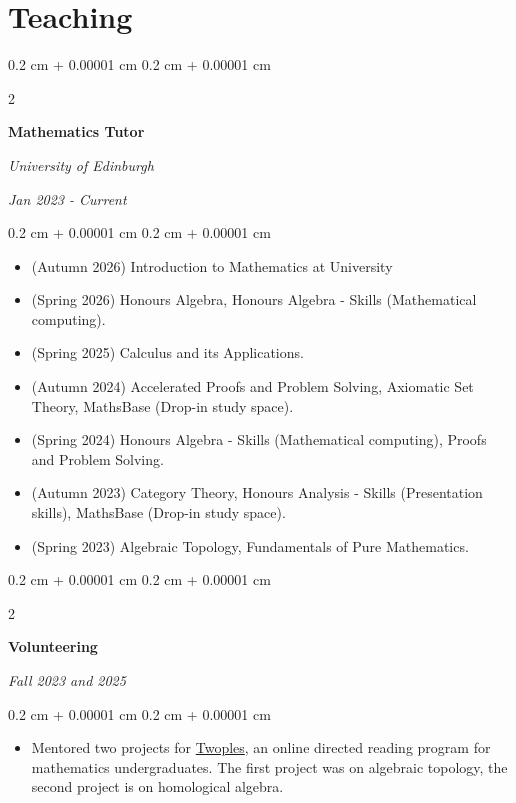 \documentclass[10pt, letterpaper]{article}
\newenvironment{highlights}{
    \begin{itemize}[
        topsep=0.10 cm,
        parsep=0.10 cm,
        partopsep=0pt,
        itemsep=0pt,
        leftmargin=0.4 cm + 10pt
    ]
}{
    \end{itemize}
} %
\newenvironment{onecolentry}{
    \begin{adjustwidth}{
        0.2 cm + 0.00001 cm
    }{
        0.2 cm + 0.00001 cm
    }
}{
    \end{adjustwidth}
} %
\newenvironment{twocolentry}[2][]{
    \onecolentry
    \def\secondColumn{#2}
    \setcolumnwidth{\fill, 4.5 cm}
    \begin{paracol}{2}
}{
    \switchcolumn \raggedleft \secondColumn
    \end{paracol}
    \endonecolentry
} %
\let\hrefWithoutArrow\href
\renewcommand{\href}[2]{\hrefWithoutArrow{#1}{\ifthenelse{\equal{#2}{}}{ }{#2 }\raisebox{.15ex}{\footnotesize \faExternalLink*}}}
\begin{document}
    \section{Teaching}

        \begin{twocolentry}{
 
            
        \textit{Jan 2023 - Current}}
            \textbf{Mathematics Tutor}
            
            \textit{University of Edinburgh}
        \end{twocolentry}

        \vspace{0.10 cm}
        \begin{onecolentry}
            \begin{highlights}
                \item (Autumn 2026) Introduction to Mathematics at University
                \item (Spring 2026) Honours Algebra, Honours Algebra - Skills (Mathematical computing).
                \item (Spring 2025) Calculus and its Applications.
                \item (Autumn 2024) Accelerated Proofs and Problem Solving, Axiomatic Set Theory, MathsBase (Drop-in study space).
                \item (Spring 2024) Honours Algebra - Skills (Mathematical computing), Proofs and Problem Solving.
                \item (Autumn 2023) Category Theory, Honours Analysis - Skills (Presentation skills), MathsBase (Drop-in study space).
                \item (Spring 2023) Algebraic Topology, Fundamentals of Pure Mathematics.
            \end{highlights}
        \end{onecolentry}

            \begin{twocolentry}{
        \textit{Fall 2023 and 2025}}
         \vspace{0.2 cm}
            \textbf{Volunteering}
        \end{twocolentry}

        \vspace{0.10 cm}
        \begin{onecolentry}
            \begin{highlights}
                \item Mentored two projects for \hrefWithoutArrow{https://sites.google.com/view/twoples/home}{Twoples}, an online directed reading program for mathematics undergraduates. The first project was on algebraic topology, the second project is on homological algebra.
            \end{highlights}
        \end{onecolentry}
        
\end{document}
